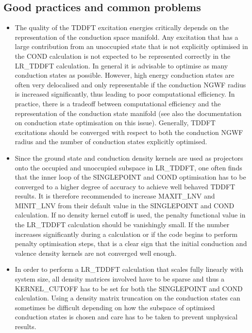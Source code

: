 \documentclass[letterpaper,10pt,english]{sphinxmanual}
\begin{document}
\subsection{Good practices and common problems}
\label{\detokenize{lr_tddft:good-practices-and-common-problems}}\begin{itemize}
\item {} 
The quality of the TDDFT excitation energies critically depends on
the representation of the conduction space manifold. Any excitation
that has a large contribution from an unoccupied state that is not
explicitly optimised in the COND calculation is not expected to be
represented correctly in the LR\_TDDFT calculation. In general it is
advisable to optimise as many conduction states as possible. However,
high energy conduction states are often very delocalised and only
representable if the conduction NGWF radius is increased
significantly, thus leading to poor computational efficiency. In
practice, there is a tradeoff between computational efficiency and
the representation of the conduction state manifold (see also the
documentation on conduction state optimisation on this issue).
Generally, TDDFT excitations should be converged with respect to both
the conduction NGWF radius and the number of conduction states
explicitly optimised.

\item {} 
Since the ground state and conduction density kernels are used as
projectors onto the occupied and unoccupied subspace in LR\_TDDFT,
one often finds that the inner loop of the SINGLEPOINT and COND
optimisation has to be converged to a higher degree of accuracy to
achieve well behaved TDDFT results. It is therefore recommended to
increase MAXIT\_LNV and MINIT\_LNV from their default value in the
SINGLEPOINT and COND calculation. If no density kernel cutoff is
used, the penalty functional value in the LR\_TDDFT calculation
should be vanishingly small. If the number increases significantly
during a calculation or if the code begins to perform penalty
optimisation steps, that is a clear sign that the initial conduction
and valence density kernels are not converged well enough.

\item {} 
In order to perform a LR\_TDDFT calculation that scales fully
linearly with system size, all density matrices involved have to be
sparse and thus a KERNEL\_CUTOFF has to be set for both the
SINGLEPOINT and COND calculation. Using a density matrix truncation
on the conduction states can sometimes be difficult depending on how
the subspace of optimised conduction states is chosen and care has to
be taken to prevent unphysical results.


\end{itemize}
\end{document}
